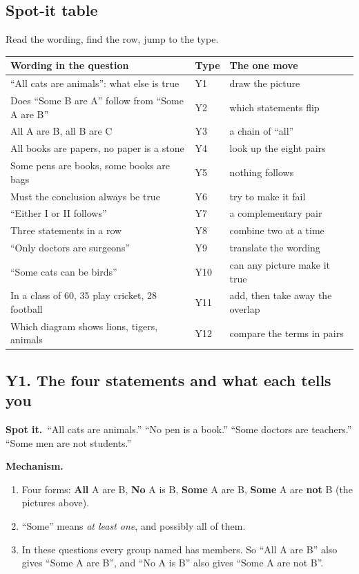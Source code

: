 \documentclass[11pt,a4paper]{article}
\let\oldsubsection\subsection
\renewcommand{\subsection}{\needspace{9\baselineskip}\oldsubsection}
\newcommand{\spot}{\textbf{\color{ember}Spot it.}\ }
\newcommand{\mech}{\textbf{\color{ember}Mechanism.}\ }
\begin{document}
\subsection*{Spot-it table}
Read the wording, find the row, jump to the type.
\begin{center}\small\renewcommand{\arraystretch}{1.18}\setlength{\tabcolsep}{7pt}
\begin{tabularx}{\linewidth}{@{}>{\raggedright\arraybackslash}X l >{\raggedright\arraybackslash}X@{}}
\toprule
\textbf{\color{slate}Wording in the question} & \textbf{\color{slate}Type} & \textbf{\color{slate}The one move} \\ \midrule
``All cats are animals'': what else is true & Y1 & draw the picture \\
Does ``Some B are A'' follow from ``Some A are B'' & Y2 & which statements flip \\
All A are B, all B are C & Y3 & a chain of ``all'' \\
All books are papers, no paper is a stone & Y4 & look up the eight pairs \\
Some pens are books, some books are bags & Y5 & nothing follows \\
Must the conclusion always be true & Y6 & try to make it fail \\
``Either I or II follows'' & Y7 & a complementary pair \\
Three statements in a row & Y8 & combine two at a time \\
``Only doctors are surgeons'' & Y9 & translate the wording \\
``Some cats can be birds'' & Y10 & can any picture make it true \\
In a class of 60, 35 play cricket, 28 football & Y11 & add, then take away the overlap \\
Which diagram shows lions, tigers, animals & Y12 & compare the terms in pairs \\
\bottomrule
\end{tabularx}\end{center}

\subsection{Y1. The four statements and what each tells you}
\spot ``All cats are animals.'' ``No pen is a book.'' ``Some doctors are teachers.'' ``Some men are not students.''

\mech
\begin{enumerate}
\item Four forms: \textbf{All} A are B, \textbf{No} A is B, \textbf{Some} A are B, \textbf{Some} A are \textbf{not} B (the pictures above).
\item ``Some'' means \emph{at least one}, and possibly all of them.
\item In these questions every group named has members. So ``All A are B'' also gives ``Some A are B'', and ``No A is B'' also gives ``Some A are not B''.
\end{enumerate}
\end{document}
